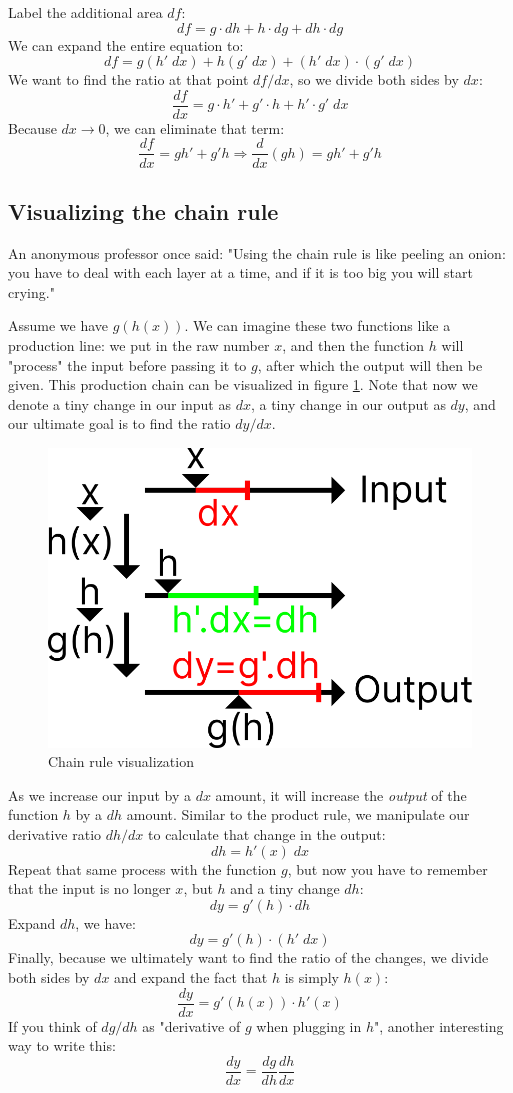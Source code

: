 Label the additional area $df$:
\[ df = g \cdot dh + h \cdot dg + dh \cdot dg \]
We can expand the entire equation to:
\[ df = g(h' \;dx) + h(g' \;dx) + (h' \;dx) \cdot (g' \;dx) \]
We want to find the ratio at that point $df/dx$, so we divide both sides by $dx$:
\[ \frac{df}{dx} = g \cdot h' + g' \cdot h + h' \cdot g' \;dx \]
Because $dx\to0$, we can eliminate that term:
\[
    \frac{df}{dx} = gh' + g'h
    \Rightarrow
    \frac{d}{dx}(gh) = gh' + g'h
\]

\subsection{Visualizing the chain rule}
An anonymous professor once said: "Using the chain rule is like peeling an onion: you have to deal with each layer at a time, and if it is too big you will start crying." 

Assume we have $g(h(x))$. We can imagine these two functions like a production line: we put in the raw number $x$, and then the function $h$ will "process" the input before passing it to $g$, after which the output will then be given. This production chain can be visualized in figure \ref{fig:m12}. Note that now we denote a tiny change in our input as $dx$, a tiny change in our output as $dy$, and our ultimate goal is to find the ratio $dy/dx$.
\begin{figure}
    \centering
    \includegraphics[width=0.5\linewidth]{math/12.png}
    \caption{Chain rule visualization}
    \label{fig:m12}
\end{figure}

As we increase our input by a $dx$ amount, it will increase the \textit{output} of the function $h$ by a $dh$ amount. Similar to the product rule, we manipulate our derivative ratio $dh/dx$ to calculate that change in the output:
\[ dh = h'(x) \;dx \]
Repeat that same process with the function $g$, but now you have to remember that the input is no longer $x$, but $h$ and a tiny change $dh$:
\[ dy = g'(h) \cdot dh \]
Expand $dh$, we have:
\[ dy = g'(h) \cdot (h' \;dx) \]
Finally, because we ultimately want to find the ratio of the changes, we divide both sides by $dx$ and expand the fact that $h$ is simply $h(x)$:
\[ \frac{dy}{dx} = g'(h(x)) \cdot h'(x) \]
If you think of  $dg/dh$ as "derivative of $g$ when plugging in $h$", another interesting way to write this:
\[ \frac{dy}{dx} = \frac{dg}{dh}\frac{dh}{dx} \]

